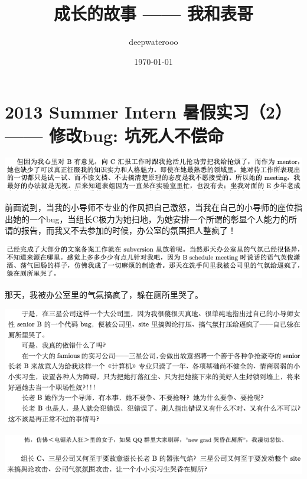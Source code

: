\documentclass[9pt, b5paper]{article}
\author{deepwaterooo}
\date{\today}
\title{成长的故事 —— 我和表哥}
\begin{document}
\maketitle
\tableofcontents


\section{2013 Summer Intern 暑假实习（2） —— 修改bug: 坑死人不偿命}
\label{sec:orgd71d438}

\begin{center}
\includegraphics[width=.9\linewidth]{./pic/backups_plans_20210507_091504.png}
\end{center}

前面说到，当我的小导师不专业的作风把自己激怒，当我在自己的小导师的座位指出她的一个bug，当组长C极力为她扫地，为她安排一个所谓的彰显个人能力的所谓的报告，而我又不去参加的时候，办公室的氛围把人整疯了！

\begin{center}
\includegraphics[width=.9\linewidth]{./pic/backups_plans_20210507_091648.png}
\end{center}

那天，我被办公室里的气氛搞疯了，躲在厕所里哭了。 

\begin{center}
\includegraphics[width=.9\linewidth]{./pic/backups_plans_20210507_091755.png}
\end{center}

\begin{center}
\includegraphics[width=.9\linewidth]{./pic/backups_plans_20210507_091828.png}
\end{center}
\end{document}
